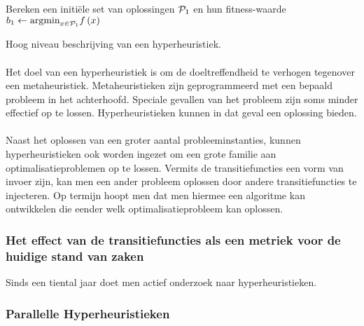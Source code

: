 \begin{algorithm}[H]
 \SetAlgoLined
 Bereken een initi\"ele set van oplossingen $\mathcal{P}_1$ en hun fitness-waarde\;
 $b_1\leftarrow\displaystyle\mbox{argmin}_{x\in\mathcal{P}_1}{f\left(x\right)}$\;
 \caption{Hoog niveau beschrijving van een hyperheuristiek.}
\end{algorithm}

\paragraph{}
Het doel van een hyperheuristiek is om de doeltreffendheid te verhogen tegenover een metaheuristiek. Metaheuristieken zijn geprogrammeerd met een bepaald probleem in het achterhoofd. Speciale gevallen van het probleem zijn soms minder effectief op te lossen. Hyperheuristieken kunnen in dat geval een oplossing bieden.

\paragraph{}
Naast het oplossen van een groter aantal probleeminstanties, kunnen hyperheuristieken ook worden ingezet om een grote familie aan optimalisatieproblemen op te lossen. Vermits de transitiefuncties een vorm van invoer zijn, kan men een ander probleem oplossen door andere transitiefuncties te injecteren. Op termijn hoopt men dat men hiermee een algoritme kan ontwikkelen die eender welk optimalisatieprobleem kan oplossen.

\subsubsection{Het effect van de transitiefuncties als een metriek voor de huidige stand van zaken}
Sinds een tiental jaar doet men actief onderzoek naar hyperheuristieken.

\subsubsection{Parallelle Hyperheuristieken}



